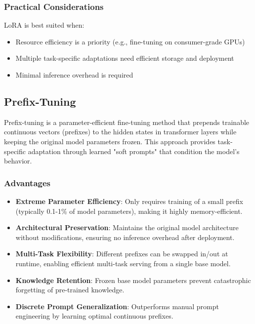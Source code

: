 \subsubsection{Practical Considerations}
LoRA is best suited when:
\begin{itemize}
    \item Resource efficiency is a priority (e.g., fine-tuning on consumer-grade GPUs)
    \item Multiple task-specific adaptations need efficient storage and deployment
    \item Minimal inference overhead is required
\end{itemize}


\subsection{Prefix-Tuning}

Prefix-tuning is a parameter-efficient fine-tuning method that prepends trainable continuous vectors (prefixes) to the hidden states in transformer layers while keeping the original model parameters frozen. This approach provides task-specific adaptation through learned "soft prompts" that condition the model's behavior.

\subsubsection{Advantages}
\begin{itemize}
    \item \textbf{Extreme Parameter Efficiency}: Only requires training of a small prefix (typically 0.1-1\% of model parameters), making it highly memory-efficient.
    
    \item \textbf{Architectural Preservation}: Maintains the original model architecture without modifications, ensuring no inference overhead after deployment.
    
    \item \textbf{Multi-Task Flexibility}: Different prefixes can be swapped in/out at runtime, enabling efficient multi-task serving from a single base model.
    
    \item \textbf{Knowledge Retention}: Frozen base model parameters prevent catastrophic forgetting of pre-trained knowledge.
    
    \item \textbf{Discrete Prompt Generalization}: Outperforms manual prompt engineering by learning optimal continuous prefixes.
\end{itemize}

